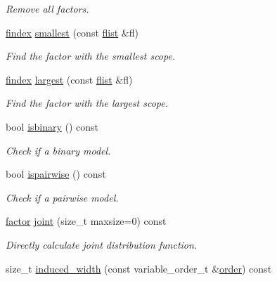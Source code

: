 \begin{DoxyCompactItemize}
\begin{DoxyCompactList}\small\item\em Remove all factors. \end{DoxyCompactList}\item 
\hyperlink{classmerlin_1_1graphical__model_ab2b46f09d8142bb68f243ecadbdabb6b}{findex} \hyperlink{classmerlin_1_1graphical__model_a87052337ee867285fc2700d00995cc1e}{smallest} (const \hyperlink{classmerlin_1_1graphical__model_a615e25ec6594615fddfd4c3c4776b99f}{flist} \&fl)
\begin{DoxyCompactList}\small\item\em Find the factor with the smallest scope. \end{DoxyCompactList}\item 
\hyperlink{classmerlin_1_1graphical__model_ab2b46f09d8142bb68f243ecadbdabb6b}{findex} \hyperlink{classmerlin_1_1graphical__model_abe468de8ee79157ccfd329dae24fa221}{largest} (const \hyperlink{classmerlin_1_1graphical__model_a615e25ec6594615fddfd4c3c4776b99f}{flist} \&fl)
\begin{DoxyCompactList}\small\item\em Find the factor with the largest scope. \end{DoxyCompactList}\item 
bool \hyperlink{classmerlin_1_1graphical__model_a501d99e0c317cc1d3497b2f459888012}{isbinary} () const 
\begin{DoxyCompactList}\small\item\em Check if a binary model. \end{DoxyCompactList}\item 
bool \hyperlink{classmerlin_1_1graphical__model_aa4a11eec647e40d3f4ce47a1b31e9a5e}{ispairwise} () const 
\begin{DoxyCompactList}\small\item\em Check if a pairwise model. \end{DoxyCompactList}\item 
\hyperlink{classmerlin_1_1factor}{factor} \hyperlink{classmerlin_1_1graphical__model_a7b3e5d2e0b423e481019f224971e0d29}{joint} (size\+\_\+t maxsize=0) const 
\begin{DoxyCompactList}\small\item\em Directly calculate joint distribution function. \end{DoxyCompactList}\item 
size\+\_\+t \hyperlink{classmerlin_1_1graphical__model_a109e5f71e08368d3460ab4a74e1074fb}{induced\+\_\+width} (const variable\+\_\+order\+\_\+t \&\hyperlink{classmerlin_1_1graphical__model_a90bcf3fb02f0f43bf57520e834875c78}{order}) const 

\end{DoxyCompactItemize}

